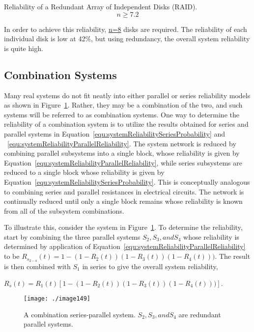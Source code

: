 {\begin{example}{Reliability of a Redundant Array of Independent Disks (RAID).}
$$n \geq 7.2$$
\end{example}

In order to achieve this reliability, \ul{n=8} disks are required. The
reliability of each individual disk is low at 42\%, but using
redundancy, the overall system reliability is quite high.

\subsection{Combination Systems}
\label{subsection:combination-systems}

Many real systems do not fit neatly into either parallel or series
reliability models as shown in Figure~\ref{figure:systemReliabilitySeriesParallel}. 
Rather, they may be a
combination of the two, and such systems will be referred to as
combination systems. One way to determine the reliability of a
combination system is to utilize the results obtained for series and
parallel systems in 
Equation~\ref{equ:systemReliabilitySeriesProbability}
 and ~\ref{equ:systemReliabilityParallelReliability}. The 
 system network is reduced by
combining parallel subsystems into a single block, whose reliability is
given by 
Equation~\ref{equ:systemReliabilityParallelReliability}, while series 
subsystems are reduced to a single block
whose reliability is given by 
Equation~\ref{equ:systemReliabilitySeriesProbability}. This is conceptually analogous to
combining series and parallel resistances in electrical circuits. The
network is continually reduced until only a single block remains whose
reliability is known from all of the subsystem combinations.

To illustrate this, consider the system in 
Figure~\ref{figure:systemReliabilitySeriesParallel}. To determine the
reliability, start by combining the three parallel systems
$S_2, S_3, and S_4$ whose
reliability is determined by application of 
Equation~\ref{equ:systemReliabilityParallelReliability} to be 
$R_{s_{2-4}}(t) = 1- (1-R_2(t))(1-R_3(t))(1-R_4(t)))$.
The result is then combined with $S_1$ in series to give the
overall system reliability, 

$R_{s}(t) = R_1(t) \left[ 1- (1-R_2(t))(1-R_3(t))(1-R_4(t))) \right]$.


\begin{figure}[h]
\centering
\texttt{[image: ./image149]}
\caption{A combination series-parallel system. $S_2, S_3, and S_4$
are redundant parallel systems.}
\label{figure:systemReliabilitySeriesParallel}
\end{figure}


}
